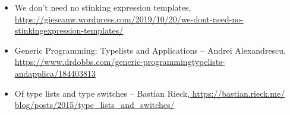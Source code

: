 \begin{itemize}
\item
We don’t need no stinking expression templates, \url{https://gieseanw.wordpress.com/2019/10/20/we-dont-need-no-stinkingexpression-templates/}

\item
Generic Programming: Typelists and Applications – Andrei Alexandrescu, \url{https://www.drdobbs.com/generic-programmingtypelists-andapplica/184403813}

\item
Of type lists and type switches – Bastian Rieck,\url{ https://bastian.rieck.me/ blog/posts/2015/type_lists_and_switches/}
\end{itemize}